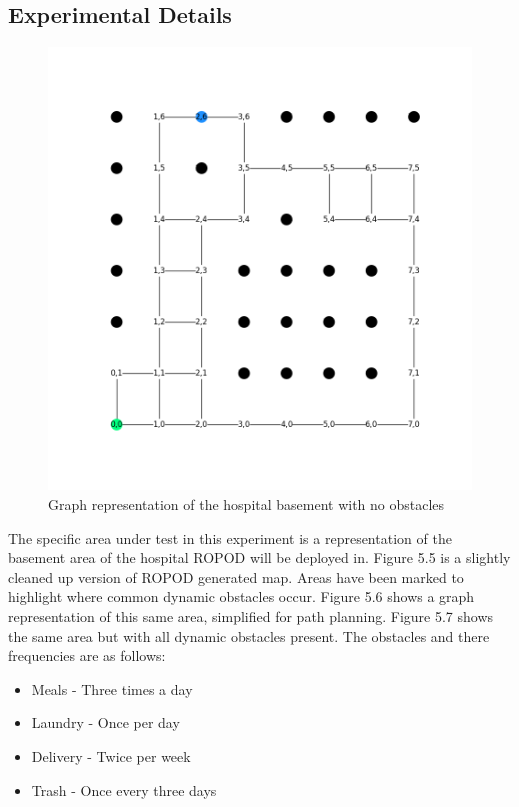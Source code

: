   \clearpage


  \subsection{ Experimental Details }

  \begin{figure}[!htb]
    \centering
    \includegraphics[width=\linewidth]{images/results/Empty_Hospital.png}
    \caption{Graph representation of the hospital basement with no obstacles}
    \label{figure:basement_congestion_empty}
  \end{figure}

  The specific area under test in this experiment is a representation
  of the basement area of the hospital ROPOD will be deployed in. Figure 5.5
  is a slightly cleaned up version of ROPOD generated map. Areas have been marked
  to highlight where common dynamic obstacles occur. Figure 5.6 shows a graph
  representation of this same area, simplified for path planning. Figure 5.7
  shows the same area but with all dynamic obstacles present. The obstacles
  and there frequencies are as follows: \\

  \begin{itemize}

    \item Meals - Three times a day

    \item Laundry - Once per day

    \item Delivery - Twice per week

    \item Trash - Once every three days

  \end{itemize}

